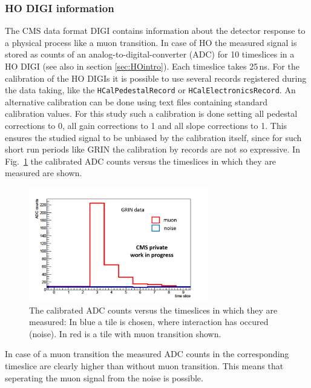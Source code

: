 		\subsubsection{HO DIGI information}
			The CMS data format DIGI contains information about the detector response to a physical process like a muon transition.
			In case of HO the measured signal is stored as counts of an analog-to-digital-converter (ADC) for 10 timeslices in a HO DIGI (see also in section \ref{sec:HOintro}).
			Each timeslice takes 25\,ns.
			For the calibration of the HO DIGIs it is possible to use several records registered during the data taking, like the \verb+HCalPedestalRecord+ or \verb+HCalElectronicsRecord+.
			An alternative calibration can be done using text files containing standard calibration values.
			For this study such a calibration is done setting all pedestal corrections to 0, all gain corrections to 1 and all slope corrections to 1.
			This ensures the studied signal to be unbiased by the calibration itself, since for such short run periods like GRIN the calibration by records are not so expressive.
			In Fig.\ \ref{fig:adc_vs_ts} the calibrated ADC counts versus the timeslices in which they are measured are shown.
			\begin{figure}[htbp]
				\centering
				\includegraphics[width=0.70\textwidth]{Figures/erdogan/adc_vs_ts.png}
				\caption{The calibrated ADC counts versus the timeslices in which they are measured: In blue a tile is chosen, where interaction has occured (noise). In red is a tile with muon transition shown.}
				\label{fig:adc_vs_ts}
			\end{figure}
			In case of a muon transition the measured ADC counts in the corresponding timeslice are clearly higher than without muon transition.
			This means that seperating the muon signal from the noise is possible.
